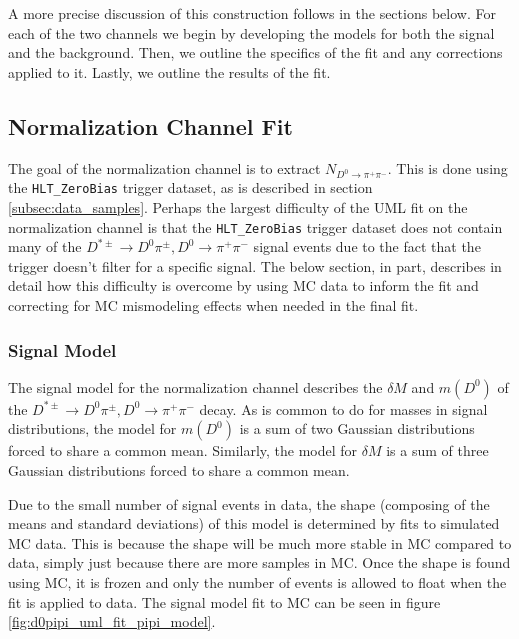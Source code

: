 A more precise discussion of this construction follows in the sections below. For each of the two channels we begin by developing the models for both the signal and the background. Then, we outline the specifics of the fit and any corrections applied to it. Lastly, we outline the results of the fit. 

\subsection{Normalization Channel Fit}
\label{subsec:normalization_channel_fit}

The goal of the normalization channel is to extract $N_{D^0 \to \pi^+ \pi^-}$. This is done using the \texttt{HLT\_ZeroBias} trigger dataset, as is described in section \ref{subsec:data_samples}. Perhaps the largest difficulty of the UML fit on the normalization channel is that the \texttt{HLT\_ZeroBias} trigger dataset does not contain many of the $D^{*\pm}\to D^0 \pi^\pm, D^0 \to \pi^+ \pi^-$ signal events due to the fact that the trigger doesn't filter for a specific signal. The below section, in part, describes in detail how this difficulty is overcome by using MC data to inform the fit and correcting for MC mismodeling effects when needed in the final fit. 

\subsubsection{Signal Model}

The signal model for the normalization channel describes the $\delta M$ and $m(D^0)$ of the $D^{*\pm}\to D^0 \pi^\pm, D^0 \to \pi^+ \pi^-$ decay. As is common to do for masses in signal distributions, the model for $m(D^0)$ is a sum of two Gaussian distributions forced to share a common mean. Similarly, the model for $\delta M$ is a sum of three Gaussian distributions forced to share a common mean.

Due to the small number of signal events in data, the shape (composing of the means and standard deviations) of this model is determined by fits to simulated MC data. This is because the shape will be much more stable in MC compared to data, simply just because there are more samples in MC. Once the shape is found using MC, it is frozen and only the number of events is allowed to float when the fit is applied to data. The signal model fit to MC can be seen in figure \ref{fig:d0pipi_uml_fit_pipi_model}.

